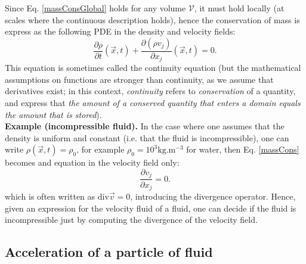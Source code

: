 \documentclass[DIV=12]{article}
\newcommand{\kg}{\mathrm{kg}}
\newcommand{\m}{\mathrm{m}}
\begin{document}
 Since Eq. \ref{massConsGlobal} holds for any volume
 $\mathcal{V}$, it must hold locally (at scales where the continuous description holds), hence
 the conservation of mass is express as the following PDE in the density and velocity fields:
\begin{equation}
\boxed{
\frac{\partial\rho}{\partial t}( \vec{x}, t)+ \frac{\partial (\rho v_j)}{\partial x_j}( \vec{x},t) = 0.}
\label{massCons}
\end{equation}
 This equation is sometimes called the continuity equation (but the mathematical assumptions
 on functions are stronger than continuity, as we assume that derivatives exist; in this context,
 {\emph{continuity}} refers to {\emph{conservation}} of a quantity, and express that {\emph{the amount
 of a conserved quantity that enters
 a domain equals the amount that is stored}}). \\

{\bf{Example (incompressible fluid).}} In the case where one assumes that the density 
 is uniform and constant (i.e. that the fluid is incompressible), one can write $\rho(\vec{x},t) = \rho_0$,
 for example $\rho_0 = 10^3 \kg .\m^{-3}$ for water, then Eq. \ref{massCons} becomes and 
 equation in the velocity field only:
\begin{equation}
 \frac{\partial v_j}{\partial x_j} = 0.
 \label{incomp}
\end{equation}
 which is often written as ${\mathrm{div}} \vec{v} = 0$, introducing the 
 divergence operator. Hence, given an expression 
 for the velocity fluid of a fluid, one can decide if the fluid is incompressible
 just by computing the divergence of the velocity field.




\subsection{Acceleration of a particle of fluid}
\end{document}
